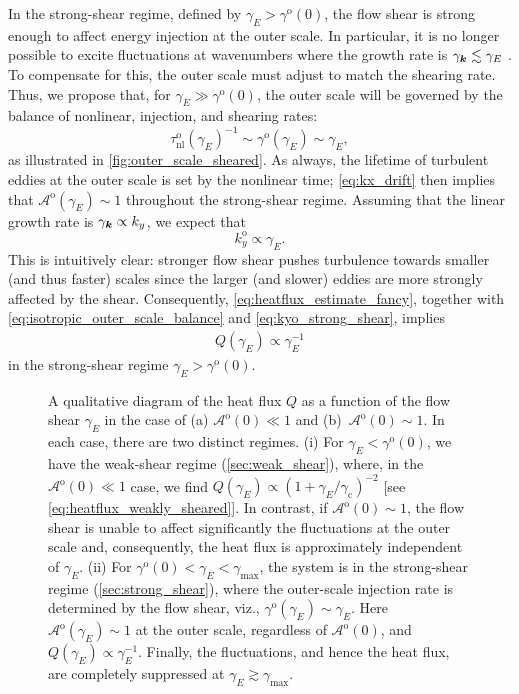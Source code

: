 \documentclass{jpp}
\newcommand{\taunlo}{\tau_\text{nl}^\text{o}}
\newcommand{\kyo}{k_y^\text{o}}
\newcommand{\gammao}{\gamma^\text{o}}
\newcommand{\gammaoO}{\gamma^\text{o}(0)}
\newcommand{\gammaani}{\gamma_{\text{c}}}
\newcommand{\gammaE}{\gamma_{E}}
\newcommand{\A}{\mathcal{A}}
\newcommand{\Ao}{\A^\text{o}}
\newcommand{\AoO}{\A^\text{o}(0)}
\begin{document}
In the strong-shear regime, defined by \(\gammaE > \gammao(0)\), the flow shear is strong enough to affect energy injection at the outer scale. In particular, it is no longer possible to excite fluctuations at wavenumbers where the growth rate is \(\gamma_\vk \lesssim \gammaE\) \citep{waltz94, waltz98}. To compensate for this, the outer scale must adjust to match the shearing rate. Thus, we propose that, for \(\gammaE \gg \gammaoO\), the outer scale will be governed by the balance of nonlinear, injection, and shearing rates:
\begin{equation}
	\taunlo(\gammaE)^{-1} \sim \gammao(\gammaE) \sim \gammaE, 
	\label{eq:isotropic_outer_scale_balance}
\end{equation}
as illustrated in \cref{fig:outer_scale_sheared}. As always, the lifetime of turbulent eddies at the outer scale is set by the nonlinear time; \cref{eq:kx_drift} then implies that \(\Ao(\gammaE) \sim 1\) throughout the strong-shear regime. Assuming that the linear growth rate is \(\gamma_{\boldsymbol{k}} \propto k_y\), we expect that 
\begin{equation}
	\kyo \propto \gammaE. 
	\label{eq:kyo_strong_shear}
\end{equation}
This is intuitively clear: stronger flow shear pushes turbulence towards smaller (and thus faster) scales since the larger (and slower) eddies are more strongly affected by the shear. Consequently, \cref{eq:heatflux_estimate_fancy}, together with \cref{eq:isotropic_outer_scale_balance} and \cref{eq:kyo_strong_shear}, implies
\begin{align}
	Q(\gammaE) \propto \gammaE^{-1}
	\label{eq:heatflux_strong_shear}
\end{align}
in the strong-shear regime \(\gammaE > \gammaoO\).

\begin{figure}
	\centering
	
	
	\caption{A qualitative diagram of the heat flux \(Q\) as a function of the flow shear \(\gammaE\) in the case of (a) \(\AoO \ll 1\) and (b)~\(\AoO \sim 1\). In each case, there are two distinct regimes. (i) For \(\gammaE < \gammaoO\), we have the weak-shear regime (\cref{sec:weak_shear}), where, in the \(\AoO \ll 1\) case, we find \(Q(\gammaE) \propto (1 + \gammaE/\gammaani)^{-2}\) [see \cref{eq:heatflux_weakly_sheared}]. In contrast, if \(\AoO \sim 1\), the flow shear is unable to affect significantly the fluctuations at the outer scale and, consequently, the heat flux is approximately independent of \(\gammaE\). (ii) For \(\gammaoO < \gammaE < \gamma_\text{max}\), the system is in the strong-shear regime (\cref{sec:strong_shear}), where the outer-scale injection rate is determined by the flow shear, viz., \(\gammao(\gammaE) \sim \gammaE\). Here \(\Ao(\gammaE) \sim 1\) at the outer scale, regardless of \(\AoO\), and \(Q(\gammaE)\propto\gammaE^{-1}\). Finally, the fluctuations, and hence the heat flux, are completely suppressed at \mbox{\(\gammaE \gtrsim \gamma_\text{max}\)}. }
	\label{fig:heatflux_anisotropic}
\end{figure}
\end{document}
